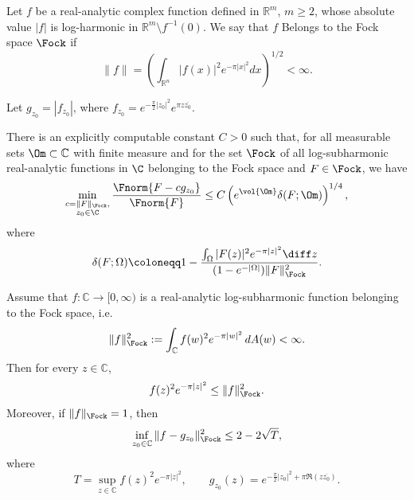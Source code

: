 \begin{numdefn}
Let $f$ be a real-analytic complex function defined in $\mathbb{R}^m$, $m\ge 2$, whose absolute value $|f|$ is log-harmonic in $\mathbb{R}^m\setminus f^{-1}(0)$.
We say that $f$ Belongs to the Fock space $\Fock$ if $$\|f\|=\left(\int_{\mathbb{R}^n}|f(x)|^2 e^{-\pi |x|^2} dx\right)^{1/2}<\infty.$$
\end{numdefn}

Let $g_{z_0}=|f_{z_0}|$, where $f_{z_0}=e^{-\frac{\pi}{2}|z_0|^2}e^{\pi z\overline{z_0}}.$
\begin{numthm}\label{thm:StabilityFockSpace}
    There is an explicitly computable constant $C>0$ such that, for all  measurable sets $\Om \subset \mathbb{C}$ with finite measure and for the set $\Fock$ of all log-subharmonic  real-analytic functions in $\C$ belonging to the Fock space and $F\in \Fock$, we have
    \begin{equation}\label{eqn:StabilityFunctionFock}
        \min_{\substack{c=\|F\|_{\Fock},\\ z_0\in \C}} \frac{\Fnorm{F-cg_{z_0}}}{\Fnorm{F}} \leq C
        \left(e^{\vol{\Om}} \delta(F;\Om)\right)^{1/4},
    \end{equation}
where
\begin{equation}
\label{defdeltaFO}
\delta(F;\Omega) \coloneqq 1-\frac{\int_\Omega |F(z)|^2 e^{-\pi |z|^2}\diff z}
{(1-e^{-|\Omega|})\Vert F\Vert_{\Fock}^2}.
\end{equation}

\end{numthm}
\begin{numlemma}\label{ulqin}
Assume that $f:\mathbb C\to[0,\infty)$ is a real-analytic log-subharmonic function
belonging to the Fock space, i.e.
\[
\|f\|_{\Fock}^2:=\int_{\mathbb C} f(w)^2 e^{-\pi |w|^2}\,dA(w)<\infty.
\]
Then for every $z\in\mathbb C$,
\[
f(z)^2e^{-\pi |z|^2}\le \|f\|_{\Fock}^2.
\]
Moreover, if $\|f\|_{\Fock}=1$, then
\[
\inf_{z_0\in \mathbb C}\|f-g_{z_0}\|_{\Fock}^2\le 2-2 \sqrt{T},
\]
where
\[
T=\sup_{z\in \mathbb C} f(z)^2e^{-\pi |z|^2},
\qquad
g_{z_0}(z)=e^{-\frac{\pi}{2}|z_0|^2+\pi \Re(z\overline{z_0})}.
\]
\end{numlemma}

